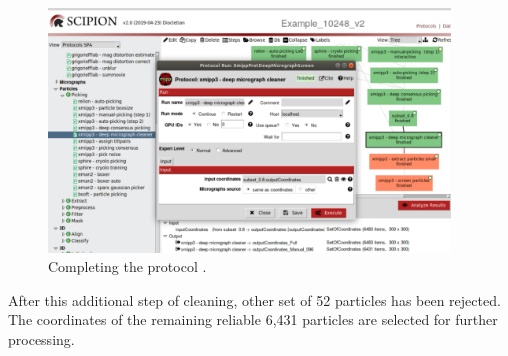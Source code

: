   \begin{figure}[H]
  \centering
  \captionsetup{width=.8\linewidth} 
  \includegraphics[width=0.95\textwidth]
  {images/xmipp_deep_micrograph_cleaner.pdf}
  \caption{Completing the protocol .}
  \label{fig:xmipp_deep_micrograph_cleaner}
  \end{figure}
  
  After this additional step of cleaning, other set of 52 particles has been rejected. The coordinates of the remaining reliable 6,431 particles are selected for further processing.\\ 

